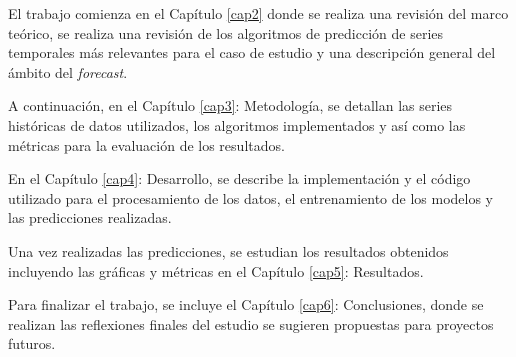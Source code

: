 El trabajo comienza en el Capítulo \ref{cap2} donde se realiza una revisión del marco teórico, se realiza una revisión de los algoritmos de predicción de series temporales más relevantes para el caso de estudio y una descripción general del ámbito del \textit{forecast}.

A continuación, en el Capítulo \ref{cap3}: Metodología, se detallan las series históricas de datos utilizados, los algoritmos implementados y así como las métricas para la evaluación de los resultados.

En el Capítulo \ref{cap4}: Desarrollo, se describe la implementación y el código utilizado para el procesamiento de los datos, el entrenamiento de los modelos y las predicciones realizadas.

Una vez realizadas las predicciones, se estudian los resultados obtenidos incluyendo las gráficas y métricas en el Capítulo \ref{cap5}: Resultados.

Para finalizar el trabajo, se incluye el Capítulo \ref{cap6}: Conclusiones, donde se realizan las reflexiones finales del estudio se sugieren propuestas para proyectos futuros.







